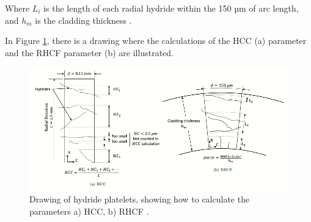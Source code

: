 \noindent
Where $L_i$ is the length of each radial hydride within the 150 µm of arc length, and $h_m$ is the cladding thickness \cite{SIMON2021152817}.

In Figure \ref{fig:parameters_drawing}, there is a drawing where the calculations of the HCC (a) parameter and the RHCF parameter (b) are illustrated.

\begin{figure}[h] %
    \centering
    \includegraphics[width=5.5in]{Figures/2-Parameters/parameters_drawing.png}
    \caption{Drawing of hydride platelets, showing how to calculate the parameters a) HCC, b) RHCF \cite{SIMON2021152817}.}
    \label{fig:parameters_drawing}
\end{figure}